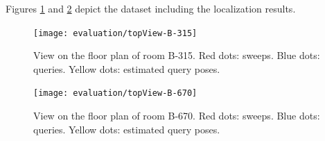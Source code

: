 \documentclass[twoside]{ctuthesis}
\theoremstyle{plain}
\theoremstyle{definition}
\theoremstyle{note}
\begin{document}
Figures \ref{fig:topView-B-315} and \ref{fig:topView-B-670} depict the dataset including the localization results.

\begin{figure}
	\centering
 	\texttt{[image: evaluation/topView-B-315]}
 	\caption{View on the floor plan of room B-315. Red dots: sweeps. Blue dots: queries. Yellow dots: estimated query poses.}
 	\label{fig:topView-B-315}
\end{figure} 

\begin{figure}
	\centering
 	\texttt{[image: evaluation/topView-B-670]}
 	\caption{View on the floor plan of room B-670. Red dots: sweeps. Blue dots: queries. Yellow dots: estimated query poses.}
 	\label{fig:topView-B-670}
\end{figure} 

\appendix

\printindex

\appendix

%



\end{document}
